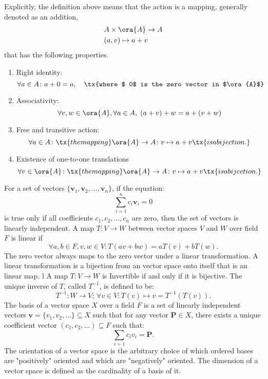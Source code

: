 \documentclass[a4paper,12pt]{article}
\begin{document}
Explicitly, the definition above means that the action is a mapping, generally denoted as an addition,
\[\begin{aligned}
& A\times\ora{A}\to A\\
& (a,v)\mapsto a+v
\end{aligned}\]
that has the following properties.
\begin{enumerate}
\item Right identity: \[\forall a\in A\colon a+0=a,\quad\tx{where $ 0$ is the zero vector in $\ora{A}$}\]
\item Associativity: \[\forall v,w\in \ora{A},\forall a\in A,\;(a+v)+w=a+(v+w)\]
\item Free and transitive action: \[\forall a\in A\colon \tx{the mapping }\ora{A}\to A\colon v\mapsto a+v\tx{ is a bijection.}\]
\item Existence of one-to-one translations \[\forall v\in \ora{A} \colon \tx{the mapping }\ora{A}\to A\colon v\mapsto a+v\tx{ is a bijection.}\]
\end{enumerate}
For a set of vectors \(\{\mathbf{v}_1,\mathbf{v}_2, \dots, \mathbf{v}_n\}\), if the equation:
\[\sum_{i=1}^nc_i\mathbf{v}_i = 0 \]
is true only if all coefficients \(c_1,c_2, \dots,c_n\) are zero, then the set of vectors is linearly independent.
A map $T\colon V\to W$ between vector spaces $V$ and $W$ over field $F$ is linear if
\[\forall a,b\in F,v,w\in V\colon T(av+bw)=aT(v)+bT(w).\]
The zero vector always maps to the zero vector under a linear transformation.
A linear transformation is a bijection from an vector space onto itself that is an linear map. l
A map $T\colon V\to W$ is Invertible if and only if it is bijective. The unique inverse of $T$, called $T^{-1}$, is defined to be:
\[T^{-1}\colon W\to V;\,\forall v\in V\colon T(v)\mapsto v=T^{-1}(T(v)).\]
The basis of a vector space $X$ over a field $F$ is a set of linearly independent vectors $\mathbf{v}=\{v_1,v_2,\dots\}\subseteq X$ such that for any vector $\mathbf{P}\in X$, there exists a unique coefficient vector $(c_1,c_2, \dots)\subseteq F$ such that:
\[\sum_{i=1}c_iv_i=\mathbf{P}.\]
The orientation of a vector space is the arbitrary choice of which ordered bases are "positively" oriented and which are "negatively" oriented.
The dimension of a vector space is defined as the cardinality of a basis of it.
\end{document}
